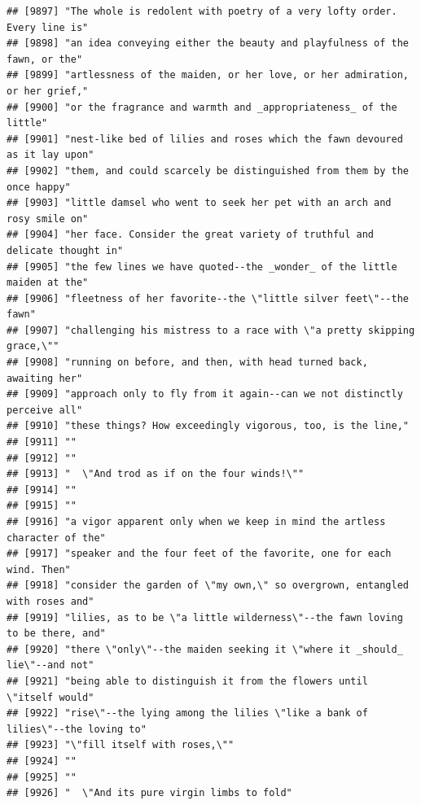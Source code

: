 \documentclass{article}\usepackage[]{graphicx}\usepackage[]{color}
\makeatletter
\newenvironment{kframe}{%
 \def\at@end@of@kframe{}%
 \ifinner\ifhmode%
  \def\at@end@of@kframe{\end{minipage}}%
  \begin{minipage}{\columnwidth}%
 \fi\fi%
 \def\FrameCommand##1{\hskip\@totalleftmargin \hskip-\fboxsep
 \colorbox{shadecolor}{##1}\hskip-\fboxsep
     \hskip-\linewidth \hskip-\@totalleftmargin \hskip\columnwidth}%
 \MakeFramed {\advance\hsize-\width
   \@totalleftmargin\z@ \linewidth\hsize
   \@setminipage}}%
 {\par\unskip\endMakeFramed%
 \at@end@of@kframe}
\newenvironment{knitrout}{}{} %
\makeatother
\begin{document}
\begin{knitrout}
\begin{kframe}
\begin{verbatim}
## [9897] "The whole is redolent with poetry of a very lofty order. Every line is"      
## [9898] "an idea conveying either the beauty and playfulness of the fawn, or the"     
## [9899] "artlessness of the maiden, or her love, or her admiration, or her grief,"    
## [9900] "or the fragrance and warmth and _appropriateness_ of the little"             
## [9901] "nest-like bed of lilies and roses which the fawn devoured as it lay upon"    
## [9902] "them, and could scarcely be distinguished from them by the once happy"       
## [9903] "little damsel who went to seek her pet with an arch and rosy smile on"       
## [9904] "her face. Consider the great variety of truthful and delicate thought in"    
## [9905] "the few lines we have quoted--the _wonder_ of the little maiden at the"      
## [9906] "fleetness of her favorite--the \"little silver feet\"--the fawn"             
## [9907] "challenging his mistress to a race with \"a pretty skipping grace,\""        
## [9908] "running on before, and then, with head turned back, awaiting her"            
## [9909] "approach only to fly from it again--can we not distinctly perceive all"      
## [9910] "these things? How exceedingly vigorous, too, is the line,"                   
## [9911] ""                                                                            
## [9912] ""                                                                            
## [9913] "  \"And trod as if on the four winds!\""                                     
## [9914] ""                                                                            
## [9915] ""                                                                            
## [9916] "a vigor apparent only when we keep in mind the artless character of the"     
## [9917] "speaker and the four feet of the favorite, one for each wind. Then"          
## [9918] "consider the garden of \"my own,\" so overgrown, entangled with roses and"   
## [9919] "lilies, as to be \"a little wilderness\"--the fawn loving to be there, and"  
## [9920] "there \"only\"--the maiden seeking it \"where it _should_ lie\"--and not"    
## [9921] "being able to distinguish it from the flowers until \"itself would"          
## [9922] "rise\"--the lying among the lilies \"like a bank of lilies\"--the loving to" 
## [9923] "\"fill itself with roses,\""                                                 
## [9924] ""                                                                            
## [9925] ""                                                                            
## [9926] "  \"And its pure virgin limbs to fold"                                       

\end{verbatim}
\end{kframe}
\end{knitrout}
\end{document}
